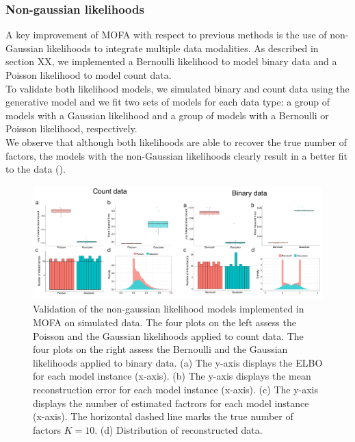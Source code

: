 \subsubsection{Non-gaussian likelihoods}
A key improvement of MOFA with respect to previous methods is the use of non-Gaussian likelihoods to integrate multiple data modalities. As described in section XX, we implemented a Bernoulli likelihood to model binary data and a Poisson likelihood to model count data.\\
To validate both likelihood models, we simulated binary and count data using the generative model and we fit two sets of models for each data type: a group of models with a Gaussian likelihood and a group of models with a Bernoulli or Poisson likelihood, respectively.\\
We observe that although both likelihoods are able to recover the true number of factors, the models with the non-Gaussian likelihoods clearly result in a better fit to the data ().

\begin{figure}[H]
	\centering 	
	\includegraphics[width=1.0\textwidth]{MOFA_nongaussian}
	\caption{Validation of the non-gaussian likelihood models implemented in MOFA on simulated data. The four plots on the left assess the Poisson and the Gaussian likelihoods applied to count data. The four plots on the right assess the Bernoulli and the Gaussian likelihoods applied to binary data. (a) The y-axis displays the ELBO for each model instance (x-axis). (b) The y-axis displays the mean reconstruction error for each model instance (x-axis). (c) The y-axis displays the number of estimated factrors for each model instance (x-axis). The horizontal dashed line marks the true number of factors $K=10$. (d) Distribution of reconstructed data.}
	\label{fig:MOFA_nongaussian}
\end{figure}


